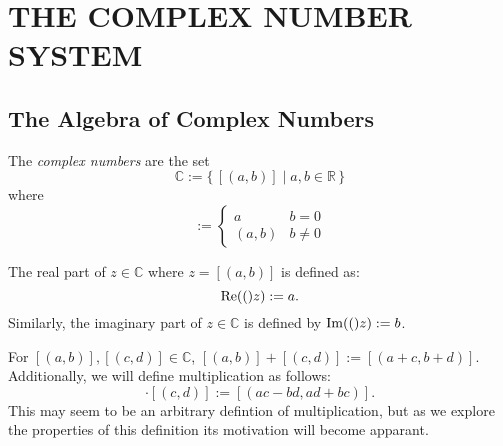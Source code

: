 \section{THE COMPLEX NUMBER SYSTEM}
\subsection{The Algebra of Complex Numbers}
\begin{definition} 
The \emph{complex numbers} are the set
\begin{equation*}
\mathbb{C} := \{\,[(a,b)] \mid a,b \in \mathbb{R}\,\}
\end{equation*}
where
\begin{equation*}
[(a,b)] :=
\begin{cases}
a & b = 0 \\
(a,b) & b \neq 0
\end{cases}
\end{equation*}
\end{definition}
\begin{definition} 
The real part of $z \in \mathbb{C}$ where $z=[(a,b)]$ is defined as:
\begin{equation*}
\operatorname{Re}({(})z) := a.
\end{equation*}
Similarly, the imaginary part of $z \in \mathbb{C}$ is defined by $\operatorname{Im}({(})z):=b$.
\end{definition}
\begin{definition} 
For $[(a,b)],[(c,d)]\in \mathbb{C}$, $[(a,b)]+[(c,d)]:=[(a+c,b+d)]$. Additionally, we will define multiplication as follows:
\begin{equation*}
[(a,b)]\cdot[(c,d)] := [(ac - bd, ad + bc)].
\end{equation*}
This may seem to be an arbitrary defintion of multiplication, but as we explore the properties of this definition its motivation will become apparant.
\end{definition}
